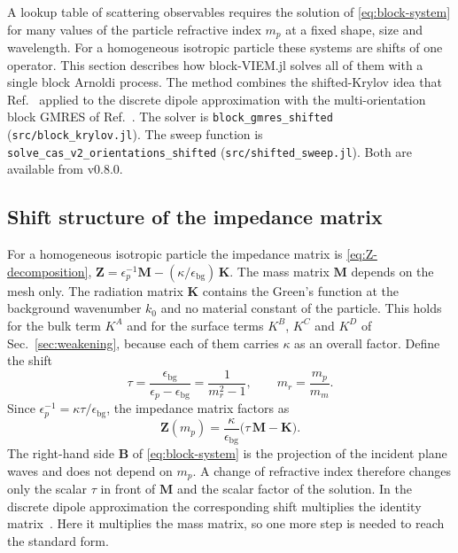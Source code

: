 \documentclass[11pt,a4paper]{article}
\begin{document}
A lookup table of scattering observables requires the solution of
\eqref{eq:block-system} for many values of the particle refractive
index $m_p$ at a fixed shape, size and wavelength.
For a homogeneous isotropic particle these systems are shifts of one
operator.
This section describes how block-VIEM.jl solves all of them with a
single block Arnoldi process.
The method combines the shifted-Krylov idea that
Ref.~\cite{Argentin2026} applied to the discrete dipole approximation
with the multi-orientation block GMRES of Ref.~\cite{Moteki2026}.
The solver is \texttt{block\_gmres\_shifted}
(\texttt{src/block\_krylov.jl}).
The sweep function is \texttt{solve\_cas\_v2\_orientations\_shifted}
(\texttt{src/shifted\_sweep.jl}).
Both are available from v0.8.0.

\subsection{Shift structure of the impedance matrix}
\label{sec:shift-structure}

For a homogeneous isotropic particle the impedance matrix is
\eqref{eq:Z-decomposition},
$\mathbf{Z} = \epsilon_p^{-1}\mathbf{M}
 - (\kappa/\epsilon_{\text{bg}})\,\mathbf{K}$.
The mass matrix $\mathbf{M}$ depends on the mesh only.
The radiation matrix $\mathbf{K}$ contains the Green's function at the
background wavenumber $k_0$ and no material constant of the particle.
This holds for the bulk term $K^{A}$ and for the surface terms
$K^{B}$, $K^{C}$ and $K^{D}$ of Sec.~\ref{sec:weakening}, because each of
them carries $\kappa$ as an overall factor.
Define the shift
\begin{equation}
  \tau = \frac{\epsilon_{\text{bg}}}{\epsilon_p - \epsilon_{\text{bg}}}
       = \frac{1}{m_r^{2} - 1},
  \qquad m_r = \frac{m_p}{m_m}.
  \label{eq:shift-tau}
\end{equation}
Since $\epsilon_p^{-1} = \kappa\tau/\epsilon_{\text{bg}}$, the
impedance matrix factors as
\begin{equation}
  \mathbf{Z}(m_p)
    = \frac{\kappa}{\epsilon_{\text{bg}}}
      \bigl(\tau\,\mathbf{M} - \mathbf{K}\bigr).
  \label{eq:shift-structure}
\end{equation}
The right-hand side $\mathbf{B}$ of \eqref{eq:block-system} is the
projection of the incident plane waves and does not depend on $m_p$.
A change of refractive index therefore changes only the scalar $\tau$
in front of $\mathbf{M}$ and the scalar factor of the solution.
In the discrete dipole approximation the corresponding shift multiplies
the identity matrix~\cite{Argentin2026}.
Here it multiplies the mass matrix, so one more step is needed to
reach the standard form.
\end{document}
